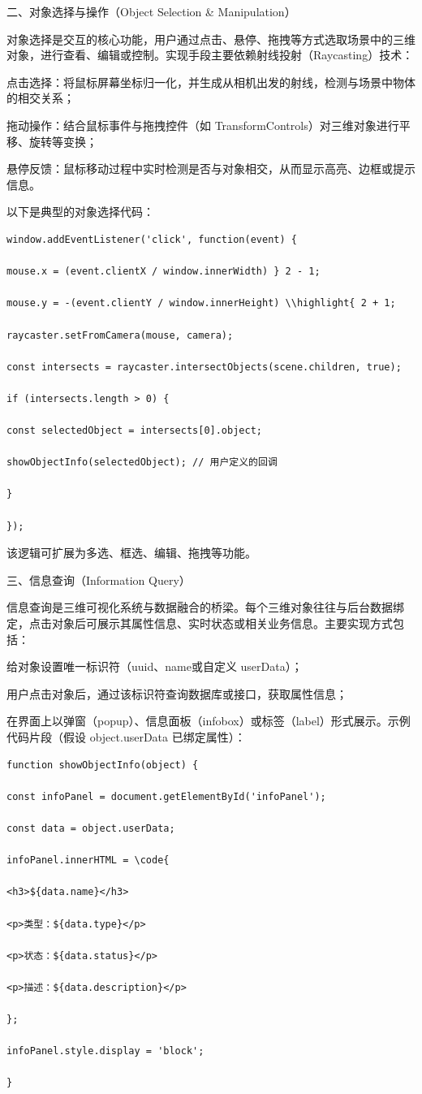 二、对象选择与操作（Object Selection \& Manipulation）

对象选择是交互的核心功能，用户通过点击、悬停、拖拽等方式选取场景中的三维对象，进行查看、编辑或控制。实现手段主要依赖射线投射（Raycasting）技术：

点击选择：将鼠标屏幕坐标归一化，并生成从相机出发的射线，检测与场景中物体的相交关系；

拖动操作：结合鼠标事件与拖拽控件（如 TransformControls）对三维对象进行平移、旋转等变换；

悬停反馈：鼠标移动过程中实时检测是否与对象相交，从而显示高亮、边框或提示信息。

以下是典型的对象选择代码：

\begin{lstlisting}[style=javascript]
window.addEventListener('click', function(event) {

mouse.x = (event.clientX / window.innerWidth) } 2 - 1;

mouse.y = -(event.clientY / window.innerHeight) \\highlight{ 2 + 1;

raycaster.setFromCamera(mouse, camera);

const intersects = raycaster.intersectObjects(scene.children, true);

if (intersects.length > 0) {

const selectedObject = intersects[0].object;

showObjectInfo(selectedObject); // 用户定义的回调

}

});
\end{lstlisting}

该逻辑可扩展为多选、框选、编辑、拖拽等功能。

三、信息查询（Information Query）

信息查询是三维可视化系统与数据融合的桥梁。每个三维对象往往与后台数据绑定，点击对象后可展示其属性信息、实时状态或相关业务信息。主要实现方式包括：

给对象设置唯一标识符（uuid、name或自定义 userData）；

用户点击对象后，通过该标识符查询数据库或接口，获取属性信息；

在界面上以弹窗（popup）、信息面板（infobox）或标签（label）形式展示。示例代码片段（假设 object.userData 已绑定属性）：

\begin{lstlisting}[style=javascript]
function showObjectInfo(object) {

const infoPanel = document.getElementById('infoPanel');

const data = object.userData;

infoPanel.innerHTML = \code{

<h3>${data.name}</h3>

<p>类型：${data.type}</p>

<p>状态：${data.status}</p>

<p>描述：${data.description}</p>

};

infoPanel.style.display = 'block';

}
\end{lstlisting}

